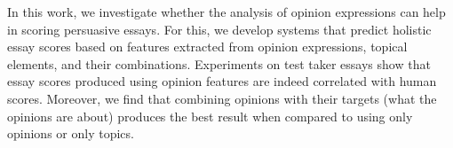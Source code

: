 In this work, we investigate whether the analysis of opinion expressions can help in scoring persuasive essays. For this, we develop systems that predict holistic essay scores based on features extracted from opinion expressions, topical elements, and their combinations. Experiments on test taker essays show that essay scores produced using opinion features are indeed correlated with human scores. Moreover, we find that combining opinions with their targets (what the opinions are about) produces the best result when compared to using only opinions or only topics.

